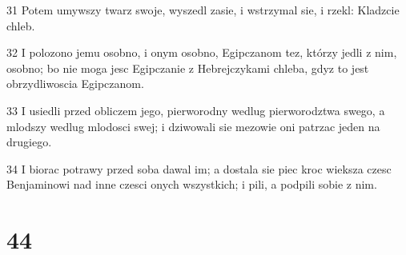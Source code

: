 \par 31 Potem umywszy twarz swoje, wyszedl zasie, i wstrzymal sie, i rzekl: Kladzcie chleb.
\par 32 I polozono jemu osobno, i onym osobno, Egipczanom tez, którzy jedli z nim, osobno; bo nie moga jesc Egipczanie z Hebrejczykami chleba, gdyz to jest obrzydliwoscia Egipczanom.
\par 33 I usiedli przed obliczem jego, pierworodny wedlug pierworodztwa swego, a mlodszy wedlug mlodosci swej; i dziwowali sie mezowie oni patrzac jeden na drugiego.
\par 34 I biorac potrawy przed soba dawal im; a dostala sie piec kroc wieksza czesc Benjaminowi nad inne czesci onych wszystkich; i pili, a podpili sobie z nim.

\chapter{44}

